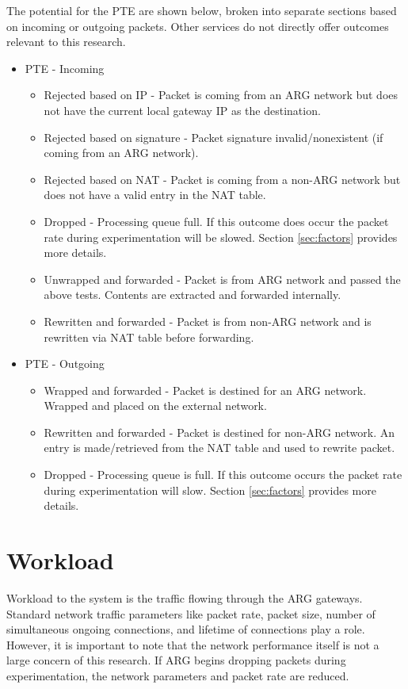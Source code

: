 \par The potential for the \ac{PTE} are shown below, broken into separate sections based on incoming or outgoing packets. Other services do not directly offer outcomes relevant to this research.
\begin{itemize}
\item \acl{PTE} - Incoming
	\begin{itemize}
	\item Rejected based on \ac{IP} - Packet is coming from an \ac{ARG} network but does not have the current local gateway \ac{IP} as the destination.
	\item Rejected based on signature - Packet signature invalid/nonexistent (if coming from an \ac{ARG} network).
	\item Rejected based on \ac{NAT} - Packet is coming from a non-\ac{ARG} network but does not have a valid entry in the \ac{NAT} table.
	\item Dropped - Processing queue full. If this outcome does occur the packet rate during experimentation will be slowed. Section \ref{sec:factors} provides more details.
	\item Unwrapped and forwarded - Packet is from \ac{ARG} network and passed the above tests. Contents are extracted and forwarded internally.
	\item Rewritten and forwarded - Packet is from non-\ac{ARG} network and is rewritten via \ac{NAT} table before forwarding.
	\end{itemize}
\item \acl{PTE} - Outgoing
	\begin{itemize}
	\item Wrapped and forwarded - Packet is destined for an \ac{ARG} network. Wrapped and placed on the external network.
	\item Rewritten and forwarded - Packet is destined for non-\ac{ARG} network. An entry is made/retrieved from the \ac{NAT} table and used to rewrite packet.
	\item Dropped - Processing queue is full.  If this outcome occurs the packet rate during experimentation will slow. Section \ref{sec:factors} provides more details.
	\end{itemize}
\end{itemize}

\section{Workload}
\label{sec:workload}
\par Workload to the system is the traffic flowing through the \ac{ARG} gateways. Standard network traffic parameters like packet rate, packet size, number of simultaneous ongoing connections, and lifetime of connections play a role. However, it is important to note that the network performance itself is not a large concern of this research. If \ac{ARG} begins dropping packets during experimentation, the network parameters and packet rate are reduced.

